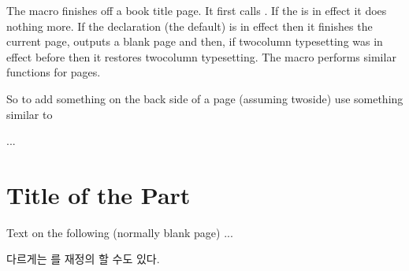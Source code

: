 The macro \cmd{\bookpageend} finishes off a book title page. It first
calls \cmd{\afterbookskip}. If the \cmd{\nobookblankpage} is in effect
it does nothing more. If the declaration \cmd{\bookblankpage} (the default)
is in effect then it finishes the current page, outputs a blank page and then,
if twocolumn typesetting was in effect before \cmd{\book} then it restores
twocolumn typesetting. The macro \cmd{\partpageend} performs similar
functions for \cmd{\part} pages.

So to add something on the back side of a \cmd{\part} page (assuming
twoside) use something similar to
\begin{lcode}
...
\nopartblankpage
\part{Title of the Part}
\thispagestyle{simple}
Text on the following (normally blank page)
\clearpage
...
\end{lcode}
다르게는 \cmd{\partpageend}를 재정의 할 수도 있다.

